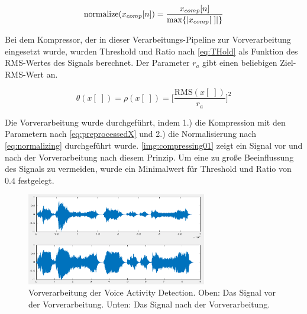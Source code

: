 \begin{equation}
\text{normalize}(x_{comp}[n]) = \frac{x_{comp}[n]}{\operatorname*{max}\{|x_{comp}[\;]|\}}
\label{eq:normalizing}
\end{equation}

Bei dem Kompressor, der in dieser Verarbeitungs-Pipeline zur Vorverarbeitung eingesetzt wurde, wurden Threshold und Ratio nach \autoref{eq:THold} als Funktion des RMS-Wertes des Signals berechnet. Der Parameter $r_a$ gibt einen beliebigen Ziel-RMS-Wert an.

\begin{equation}
\theta(x[\;]) = \rho(x[\;])  = \bigg[\frac{\text{RMS}(x[\;])}{r_a}\bigg]^{2}
\label{eq:THold}
\end{equation}

Die Vorverarbeitung wurde durchgeführt, indem 1.) die Kompression mit den Parametern nach \autoref{eq:preprocessedX} und 2.) die Normalisierung nach \autoref{eq:normalizing} durchgeführt wurde. \autoref{img:compressing01} zeigt ein Signal vor und nach der Vorverarbeitung nach diesem Prinzip. Um eine zu große Beeinflussung des Signals zu vermeiden, wurde ein Minimalwert für Threshold und Ratio von $0.4$ festgelegt.

\begin{figure}[h]
	\centering
	\includegraphics[width=0.7\textwidth]{bilder/compressing01.png}
	\caption[Vorverarbeitung der Voice Activity Detection]{Vorverarbeitung der Voice Activity Detection. Oben: Das Signal vor der Vorverarbeitung. Unten: Das Signal nach der Vorverarbeitung.}
	\label{img:compressing01}
\end{figure}

